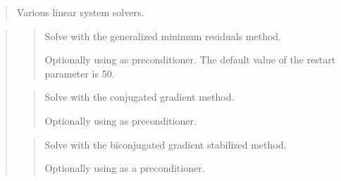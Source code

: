 \documentclass[a4paper,11pt,english]{sphinxmanual}
\begin{document}
\sphinxAtStartPar
{}
\begin{quote}

\sphinxAtStartPar
Various linear system solvers.
\end{quote}

\sphinxAtStartPar
{}
\begin{quote}

\sphinxAtStartPar
{}
\begin{quote}

\sphinxAtStartPar
Solve  with the generalized minimum residuals method.

\sphinxAtStartPar
Optionally using  as preconditioner. The default value of the
restart parameter is 50.
\end{quote}

\sphinxAtStartPar
{}
\begin{quote}

\sphinxAtStartPar
Solve  with the conjugated gradient method.

\sphinxAtStartPar
Optionally using  as preconditioner.
\end{quote}

\sphinxAtStartPar
{}
\begin{quote}

\sphinxAtStartPar
Solve  with the bi\sphinxhyphen{}conjugated gradient stabilized method.

\sphinxAtStartPar
Optionally using  as a preconditioner.
\end{quote}

\sphinxAtStartPar
{}
\begin{quote}


\end{quote}
\end{quote}
\end{document}

